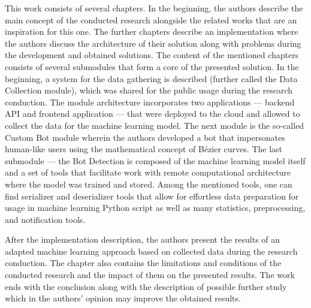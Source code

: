 This work consists of several chapters.
In the beginning, the authors describe the main concept of the conducted research alongside the related works that are an inspiration for this one.
The further chapters describe an implementation where the authors discuss the architecture of their solution along with problems during the development and obtained solutions.
The content of the mentioned chapters consists of several submodules that form a core of the presented solution.
In the beginning, a system for the data gathering is described (further called the Data Collection module), which was shared for the public usage during the research conduction.
The module architecture incorporates two applications --- backend API and frontend application --- that were deployed to the cloud and allowed to collect the data for the machine learning model.
The next module is the so-called Custom Bot module wherein the authors developed a bot that impersonates human-like users using the mathematical concept of Bézier curves.
The last submodule --- the Bot Detection is composed of the machine learning model itself and a set of tools that facilitate work with remote computational architecture where the model was trained and stored.
Among the mentioned tools, one can find serializer and deserializer tools that allow for effortless data preparation for usage in machine learning Python script as well as many statistics, preprocessing, and notification tools.

After the implementation description, the authors present the results of an adapted machine learning approach based on collected data during the research conduction.
The chapter also contains the limitations and conditions of the conducted research and the impact of them on the presented results.
The work ends with the conclusion along with the description of possible further study which in the authors' opinion may improve the obtained results.